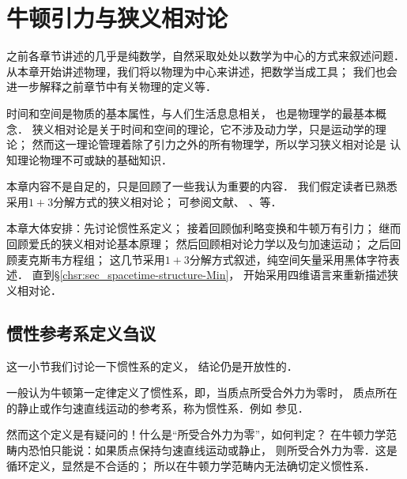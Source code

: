 
\chapter{牛顿引力与狭义相对论}\label{chsr}

之前各章节讲述的几乎是纯数学，自然采取处处以数学为中心的方式来叙述问题．
从本章开始讲述物理，我们将以物理为中心来讲述，把数学当成工具；
我们也会进一步解释之前章节中有关物理的定义等．



时间和空间是物质的基本属性，与人们生活息息相关，
也是物理学的最基本概念．
狭义相对论是关于时间和空间的理论，它不涉及动力学，只是运动学的理论；
然而这一理论管理着除了引力之外的所有物理学，所以学习狭义相对论是
认知理论物理不可或缺的基础知识．

本章内容不是自足的，只是回顾了一些我认为重要的内容．
我们假定读者已熟悉采用$1+3$分解方式的狭义相对论；
可参阅文献\parencite[Ch.1]{landau_2-classical-fields}、
\parencite[Ch.11]{jackson1998}、\parencite{liu_fei2008}等．

本章大体安排：先讨论惯性系定义； 
接着回顾伽利略变换和牛顿万有引力；
继而回顾爱氏的狭义相对论基本原理；
然后回顾相对论力学以及匀加速运动；
之后回顾麦克斯韦方程组；
这几节采用$1+3$分解方式叙述，纯空间矢量采用黑体字符表述．
直到\S\ref{chsr:sec_spacetime-structure-Min}，
开始采用四维语言来重新描述狭义相对论．



\section{惯性参考系定义刍议}\label{chsr:sec_inertialframe}

这一小节我们讨论一下惯性系的定义，
结论仍是开放性的．


 



一般认为牛顿第一定律定义了惯性系，即，当质点所受合外力为零时，
质点所在的静止或作匀速直线运动的参考系，称为惯性系．例如
参见\textcite[\S 1]{landau_2-classical-fields}．

然而这个定义是有疑问的！什么是“所受合外力为零”，如何判定？
在牛顿力学范畴内恐怕只能说：如果质点保持匀速直线运动或静止，
则所受合外力为零．这是循环定义，显然是不合适的；
所以在牛顿力学范畴内无法确切定义惯性系．

